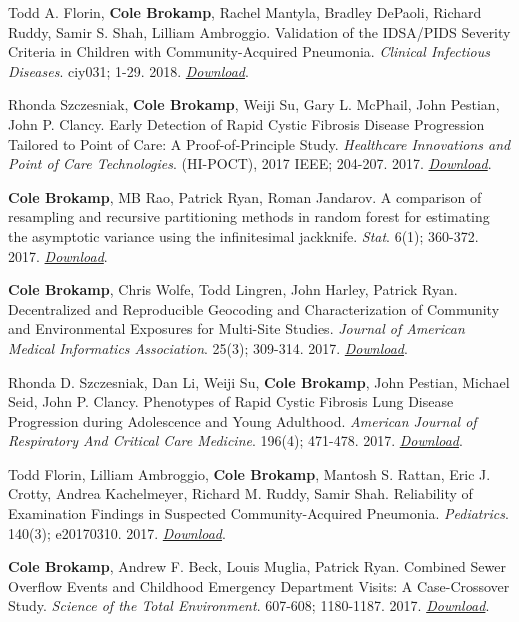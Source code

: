 Todd A. Florin, \textbf{Cole Brokamp}, Rachel Mantyla, Bradley DePaoli,
Richard Ruddy, Samir S. Shah, Lilliam Ambroggio. Validation of the
IDSA/PIDS Severity Criteria in Children with Community-Acquired
Pneumonia. \emph{Clinical Infectious Diseases}. ciy031; 1-29. 2018.
\href{https://colebrokamp-website.s3.amazonaws.com/publications/Florin_ClinicalInfectiousDiseases_2018.pdf}{\emph{Download}}.

Rhonda Szczesniak, \textbf{Cole Brokamp}, Weiji Su, Gary L. McPhail,
John Pestian, John P. Clancy. Early Detection of Rapid Cystic Fibrosis
Disease Progression Tailored to Point of Care: A Proof-of-Principle
Study. \emph{Healthcare Innovations and Point of Care Technologies}.
(HI-POCT), 2017 IEEE; 204-207. 2017.
\href{https://colebrokamp-website.s3.amazonaws.com/publications/Szczesniak_IEEE_2017.pdf}{\emph{Download}}.

\textbf{Cole Brokamp}, MB Rao, Patrick Ryan, Roman Jandarov. A
comparison of resampling and recursive partitioning methods in random
forest for estimating the asymptotic variance using the infinitesimal
jackknife. \emph{Stat}. 6(1); 360-372. 2017.
\href{https://colebrokamp-website.s3.amazonaws.com/publications/Brokamp_Stat_2017.pdf}{\emph{Download}}.

\textbf{Cole Brokamp}, Chris Wolfe, Todd Lingren, John Harley, Patrick
Ryan. Decentralized and Reproducible Geocoding and Characterization of
Community and Environmental Exposures for Multi-Site Studies.
\emph{Journal of American Medical Informatics Association}. 25(3);
309-314. 2017.
\href{https://colebrokamp-website.s3.amazonaws.com/publications/Brokamp_JAMIA_2017.pdf}{\emph{Download}}.

Rhonda D. Szczesniak, Dan Li, Weiji Su, \textbf{Cole Brokamp}, John
Pestian, Michael Seid, John P. Clancy. Phenotypes of Rapid Cystic
Fibrosis Lung Disease Progression during Adolescence and Young
Adulthood. \emph{American Journal of Respiratory And Critical Care
Medicine}. 196(4); 471-478. 2017.
\href{https://colebrokamp-website.s3.amazonaws.com/publications/Szczesniak_AJRCCM_2017.pdf}{\emph{Download}}.

Todd Florin, Lilliam Ambroggio, \textbf{Cole Brokamp}, Mantosh S.
Rattan, Eric J. Crotty, Andrea Kachelmeyer, Richard M. Ruddy, Samir
Shah. Reliability of Examination Findings in Suspected
Community-Acquired Pneumonia. \emph{Pediatrics}. 140(3); e20170310.
2017.
\href{https://colebrokamp-website.s3.amazonaws.com/publications/Florin_Pediatrics_2017.pdf}{\emph{Download}}.

\textbf{Cole Brokamp}, Andrew F. Beck, Louis Muglia, Patrick Ryan.
Combined Sewer Overflow Events and Childhood Emergency Department
Visits: A Case-Crossover Study. \emph{Science of the Total Environment}.
607-608; 1180-1187. 2017.
\href{http://colebrokamp-website.s3.amazonaws.com/publications/Brokamp_STOTEN_2017.pdf}{\emph{Download}}.

